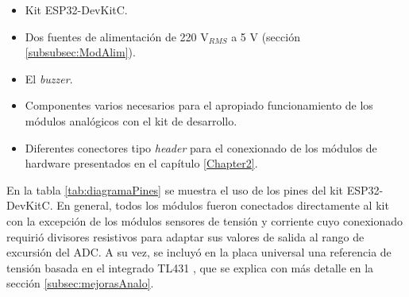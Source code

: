 \begin{itemize}
\item Kit ESP32-DevKitC.
\item Dos fuentes de alimentación de 220 V$_{RMS}$ a 5 V (sección \ref{subsubsec:ModAlim}).
\item El \textit{buzzer}. 
\item Componentes varios necesarios para el apropiado funcionamiento de los módulos analógicos con el kit de desarrollo.
\item Diferentes conectores tipo \textit{header} para el conexionado de los módulos de hardware presentados en el capítulo \ref{Chapter2}.
\end{itemize}

En la tabla \ref{tab:diagramaPines} se muestra el uso de los pines del kit ESP32-DevKitC. En general, todos los módulos fueron conectados directamente al kit con la excepción de los módulos sensores de tensión y corriente cuyo conexionado requirió divisores resistivos para adaptar sus valores de salida al rango de excursión del ADC. A su vez, se incluyó en la placa universal una referencia de tensión basada en el integrado TL431 \citep{TL431}, que se explica con más detalle en la sección \ref{subsec:mejorasAnalo}.


